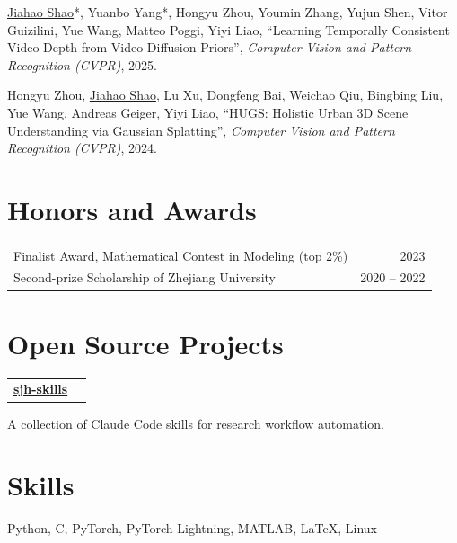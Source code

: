\documentclass[11pt]{article}
\makeatletter
\newcommand{\cventry}[2]{%
  \noindent\begin{tabularx}{\textwidth}{@{}X r@{}}
    \textbf{#1} & #2
  \end{tabularx}\par%
}
\newcommand{\me}[1]{\underline{#1}}
\makeatother
\begin{document}
\begin{enumerate}[label={[\arabic*]},leftmargin=*,itemsep=4pt]
  \item \me{Jiahao Shao}*, Yuanbo Yang*, Hongyu Zhou, Youmin Zhang, Yujun Shen, Vitor Guizilini, Yue Wang, Matteo Poggi, Yiyi Liao,
  ``Learning Temporally Consistent Video Depth from Video Diffusion Priors'',
  \textit{Computer Vision and Pattern Recognition (CVPR)}, 2025.

  \item Hongyu Zhou, \me{Jiahao Shao}, Lu Xu, Dongfeng Bai, Weichao Qiu, Bingbing Liu, Yue Wang, Andreas Geiger, Yiyi Liao,
  ``HUGS: Holistic Urban 3D Scene Understanding via Gaussian Splatting'',
  \textit{Computer Vision and Pattern Recognition (CVPR)}, 2024.
\end{enumerate}

\section*{Honors and Awards}

\noindent\begin{tabularx}{\textwidth}{@{}X r@{}}
Finalist Award, Mathematical Contest in Modeling (top 2\%) & 2023 \\
Second-prize Scholarship of Zhejiang University & 2020 -- 2022 \\
\end{tabularx}

\section*{Open Source Projects}

\cventry{\href{https://github.com/jiahao-shao1/sjh-skills}{sjh-skills}}{}
A collection of Claude Code skills for research workflow automation.

\section*{Skills}

Python, C, PyTorch, PyTorch Lightning, MATLAB, \LaTeX, Linux
\end{document}
